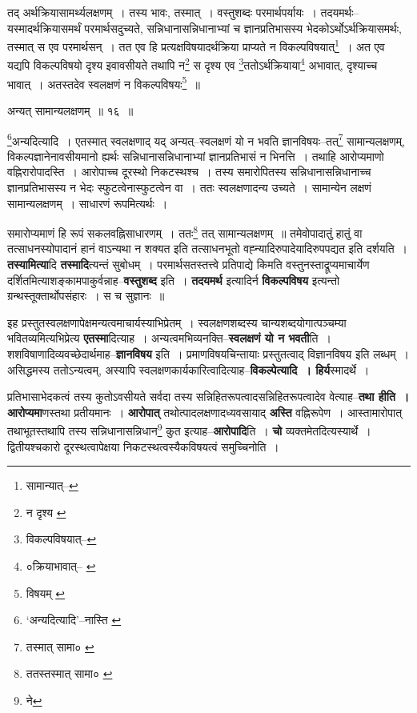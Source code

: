 \documentclass[article,12pt,a4paper]{memoir}
\begin{document}
	तद् अर्थक्रियासामर्थ्यलक्षणम् । तस्य भावः, तस्मात् । वस्तुशब्दः परमार्थपर्यायः । तदयमर्थः--यस्मादर्थक्रियासमर्थं परमार्थसदुच्यते, सन्निधानासन्निधानाभ्यां च ज्ञानप्रतिभासस्य भेदकोऽर्थोऽर्थक्रियासमर्थः, तस्मात् स एव परमार्थसन् । तत एव हि प्रत्यक्षविषयादर्थक्रिया प्राप्यते न विकल्पविषयात्\footnote{सामान्यात्--\cite{dp-msD-n}} । अत एव यद्यपि विकल्पविषयो दृश्य इवावसीयते तथापि न\footnote{न दृश्य \cite{dp-msA} \cite{dp-msB} \cite{dp-edP} \cite{dp-edH} \cite{dp-edE} \cite{dp-edN}} स दृश्य एव \footnote{विकल्पविषयात्--\cite{dp-msD-n}}ततोऽर्थक्रियाया\footnote{०क्रियाभावात्--\cite{dp-msA} \cite{dp-msB} \cite{dp-edP} \cite{dp-edH} \cite{dp-edE} \cite{dp-edN}} अभावात्, दृश्याच्च भावात् । अतस्तदेव स्वलक्षणं न विकल्पविषयः\footnote{विषयम् \cite{dp-msA} \cite{dp-msB} \cite{dp-edP} \cite{dp-edH} \cite{dp-edE} \cite{dp-edN}} ॥ 
	  
	अन्यत् सामान्यलक्षणम् ॥ १६ ॥ 
	  
	\footnote{‘अन्यदित्यादि’--नास्ति \cite{dp-msA} \cite{dp-edP} \cite{dp-edH} \cite{dp-edE} \cite{dp-edN}}अन्यदित्यादि । एतस्मात् स्वलक्षणाद् यद् अन्यत्--स्वलक्षणं यो न भवति ज्ञानविषयः--तत्\footnote{तस्मात् सामा० \cite{dp-msB}} सामान्यलक्षणम्, विकल्पज्ञानेनावसीयमानो ह्यर्थः सन्निधानासन्निधानाभ्यां ज्ञानप्रतिभासं न भिनत्ति । तथाहि आरोप्यमाणो वह्निरारोपादस्ति । आरोपाच्च दूरस्थो निकटस्थश्च । तस्य समारोपितस्य सन्निधानासन्निधानाच्च ज्ञानप्रतिभासस्य न भेदः स्फुटत्वेनास्फुटत्वेन वा । ततः स्वलक्षणादन्य उच्यते । सामान्येन लक्षणं सामान्यलक्षणम् । साधारणं रूपमित्यर्थः । 
	  
	समारोप्यमाणं हि रूपं सकलवह्निसाधारणम् । ततः\footnote{ततस्तस्मात् सामा० \cite{dp-msB}} तत् सामान्यलक्षणम् ॥ तमेवोपादातुं हातुं वा तत्साधनस्योपादानं हानं वाऽन्यथा न शक्यत इति तत्साधनभूतो वह्न्यादिरुपादेयादिरुपपद्यत इति दर्शयति । \textbf{तस्यामित्या}दि \textbf{तस्मादि}त्यन्तं सुबोधम् । परमार्थसतस्तत्त्वे प्रतिपाद्ये किमति वस्तुनस्ताद्रूप्यमाचार्येण दर्शितमित्याशङ्कामपाकुर्वन्नाह--\textbf{वस्तुशब्द} इति । \textbf{तदयमर्थ} इत्यादिर्न \textbf{विकल्पविषय} इत्यन्तो ग्रन्थस्तूक्तार्थोपसंहारः । स च सुज्ञानः ॥
	\pend
      

	  \pstart इह प्रस्तुतस्वलक्षणापेक्षमन्यत्वमाचार्यस्याभिप्रेतम् । स्वलक्षणशब्दस्य चान्यशब्दयोगात्पञ्चम्या भवितव्यमित्यभिप्रेत्य \textbf{एतस्मा}दित्याह । अन्यत्वमभिव्यनक्ति--\textbf{स्वलक्षणं यो न भवती}ति । शशविषाणादिव्यवच्छेदार्थमाह--\textbf{ज्ञानविषय} इति । प्रमाणविषयचिन्तायाः प्रस्तुतत्वाद् विज्ञानविषय इति लब्धम् । असिद्धमस्य ततोऽन्यत्वम्, अस्यापि स्वलक्षणकार्यकारित्वादित्याह--\textbf{विकल्पेत्यादि । हिर्य}स्मादर्थे ।
	\pend
      

	  \pstart प्रतिभासाभेदकत्वं तस्य कुतोऽवसीयते सर्वदा तस्य सन्निहितरूपत्वादसन्निहितरूपत्वादेव वेत्याह--\textbf{तथा हीति । आरोप्यमा}णस्तथा प्रतीयमानः । \textbf{आरोपात्} तथोत्पादलक्षणादध्यवसायाद् \textbf{अस्ति} वह्निरूपेण । आस्तामारोपात् तथाभूतस्तथापि तस्य सन्निधानासन्निधान\footnote{ने} कुत इत्याह--\textbf{आरोपादि}ति । \textbf{चो} व्यक्तमेतदित्यस्यार्थे । द्वितीयश्चकारो दूरस्थत्वापेक्षया निकटस्थत्वस्यैकविषयत्वं समुच्चिनोति ।
	\pend
      
\end{document}
